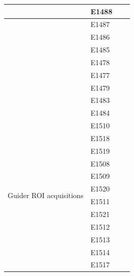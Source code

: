 \begin{longtable}{|p{2cm}|p{2cm}|p{2cm}|p{10cm}|}
& E1488 & & \\ \hline
& E1487 & & \\ \hline
& E1486 & & \\ \hline
& E1485 & & \\ \hline
& E1478 & & \\ \hline
& E1477 & & \\ \hline
& E1479 & & \\ \hline
& E1483 & & \\ \hline
& E1484 & & \\ \hline
\multirow{12}{=}{Guider ROI acquisitions} & E1510 & & \\ 
& E1518 & & \\ \hline
& E1519 & & \\ \hline
& E1508 & & \\ \hline
& E1509 & & \\ \hline
& E1520 & & \\ \hline
& E1511 & & \\ \hline
& E1521 & & \\ \hline
& E1512 & & \\ \hline
& E1513 & & \\ \hline
& E1514 & & \\ \hline
& E1517 & & \\ \hline
\end{longtable}

